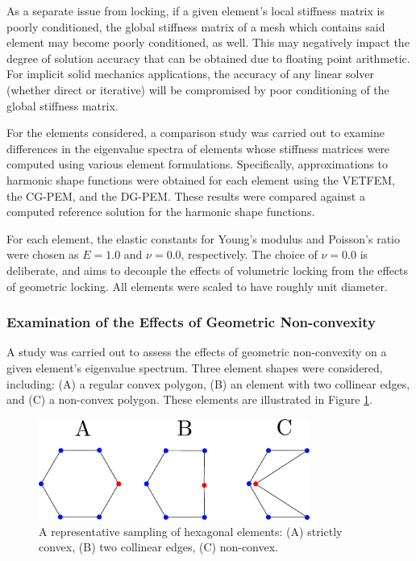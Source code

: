 As a separate issue from locking, if a given element's local stiffness matrix is poorly conditioned, the global stiffness matrix of a mesh which contains said element may become poorly conditioned, as well. This may negatively impact the degree of solution accuracy that can be obtained due to floating point arithmetic. For implicit solid mechanics applications, the accuracy of any linear solver (whether direct or iterative) will be compromised by poor conditioning of the global stiffness matrix.

For the elements considered, a comparison study was carried out to examine differences in the eigenvalue spectra of elements whose stiffness matrices were computed using various element formulations. Specifically, approximations to harmonic shape functions were obtained for each element using the VETFEM, the CG-PEM, and the DG-PEM. These results were compared against a computed reference solution for the harmonic shape functions.

For each element, the elastic constants for Young's modulus and Poisson's ratio were chosen as $E = 1.0$ and $\nu = 0.0$, respectively. The choice of $\nu = 0.0$ is deliberate, and aims to decouple the effects of volumetric locking from the effects of geometric locking. All elements were scaled to have roughly unit diameter.

\subsubsection*{Examination of the Effects of Geometric Non-convexity}

A study was carried out to assess the effects of geometric non-convexity on a given element's eigenvalue spectrum. Three element shapes were considered, including: (A) a regular convex polygon, (B) an element with two collinear edges, and (C) a non-convex polygon. These elements are illustrated in Figure \ref{fig:concave_element_shapes}.

\begin{figure}[!h]
  \centering
  \includegraphics[width=3.5in]{figures/concave_element_shapes.pdf}  \caption{A representative sampling of hexagonal elements: (A) strictly convex, (B) two collinear edges, (C) non-convex.}
  \label{fig:concave_element_shapes}
\end{figure}

